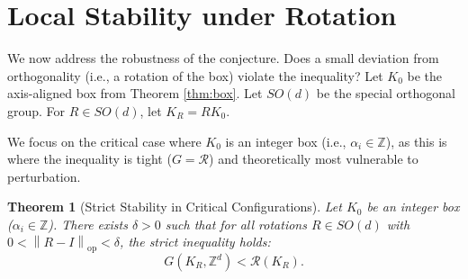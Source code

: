 \documentclass[11pt, reqno]{amsart}
\newtheorem{theorem}{Theorem}
\theoremstyle{definition}
\newcommand{\Z}{\mathbb{Z}}
\newcommand{\opnorm}[1]{\left\| #1 \right\|_{\mathrm{op}}} %
\begin{document}
\section{Local Stability under Rotation}

We now address the robustness of the conjecture. Does a small deviation from orthogonality (i.e., a rotation of the box) violate the inequality?
Let $K_0$ be the axis-aligned box from Theorem \ref{thm:box}. Let $SO(d)$ be the special orthogonal group. For $R \in SO(d)$, let $K_R = R K_0$.


We focus on the critical case where $K_0$ is an integer box (i.e., $\alpha_i \in \Z$), as this is where the inequality is tight ($G = \mathcal{R}$) and theoretically most vulnerable to perturbation.



\begin{theorem}[Strict Stability in Critical Configurations]
Let $K_0$ be an integer box ($\alpha_i \in \Z$). There exists $\delta > 0$ such that for all rotations $R \in SO(d)$ with $0 < \opnorm{R-I} < \delta$, the strict inequality holds:
\begin{equation}
    G(K_R, \Z^d) < \mathcal{R}(K_R).
\end{equation}
\end{theorem}
\end{document}
